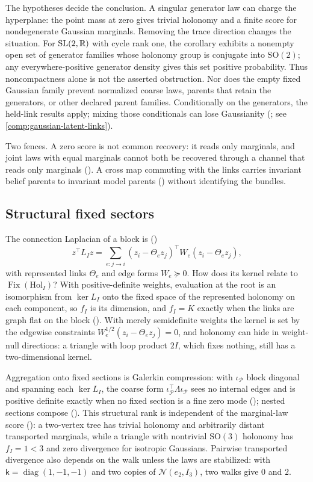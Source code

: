 The hypotheses decide the conclusion. A singular generator law can charge the hyperplane: the point
mass at zero gives trivial holonomy and a finite score for nondegenerate Gaussian marginals. Removing
the trace direction changes the situation. For $\mathrm{SL}(2,\mathbb R)$ with cycle rank one, the corollary
exhibits a nonempty open set of generator families whose holonomy group is conjugate into
$\mathrm{SO}(2)$; any everywhere-positive generator density gives this set positive probability.
Thus noncompactness alone is not the asserted obstruction. Nor does the empty fixed Gaussian family
prevent normalized coarse laws, parents that retain the generators, or other declared parent families.
Conditionally on the generators, the held-link results apply; mixing those conditionals can lose
Gaussianity (; see \cref{comp:gaussian-latent-links}).

Two fences. A zero score is not common recovery: it reads only marginals, and joint laws with equal
marginals cannot both be recovered through a channel that reads only marginals
(). A cross map commuting with the links carries invariant belief parents
to invariant model parents () without identifying the bundles.

\subsection{Structural fixed sectors}

The connection Laplacian of a block is ()
\[
z^\top L_Iz=\sum_{e:j\to i}(z_i-\Theta_ez_j)^\top W_e(z_i-\Theta_ez_j),
\]
with represented links $\Theta_e$ and edge forms $W_e\succeq0$. How does its kernel relate to
$\operatorname{Fix}(\mathrm{Hol}_I)$? With positive-definite weights, evaluation at the root is an
isomorphism from $\ker L_I$ onto the fixed space of the represented holonomy on each component, so $f_I$
is its dimension, and $f_I=K$ exactly when the links are graph flat on the block
(). With merely semidefinite weights the kernel is set by the edgewise
constraints $W_e^{1/2}(z_i-\Theta_ez_j)=0$, and holonomy can hide in weight-null directions: a triangle
with loop product $2I$, which fixes nothing, still has a two-dimensional kernel.

Aggregation onto fixed sections is Galerkin compression: with $\iota_{\mathcal P}$ block diagonal and
spanning each $\ker L_I$, the coarse form $\iota_{\mathcal P}^\top\Lambda\iota_{\mathcal P}$ sees no internal
edges and is positive definite exactly when no fixed section is a fine zero mode
(); nested sections compose ().
This structural rank is independent of the marginal-law score (): a
two-vertex tree has trivial holonomy and arbitrarily distant transported marginals, while a triangle
with nontrivial $\mathrm{SO}(3)$ holonomy has $f_I=1<3$ and zero divergence for isotropic Gaussians.
Pairwise transported divergence also depends on the walk unless the laws are stabilized: with
$\mathsf k=\operatorname{diag}(1,-1,-1)$ and two copies of $\mathcal N(e_2,I_3)$, two walks give $0$ and $2$.

